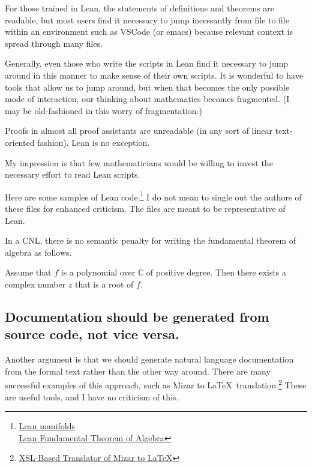 \documentclass[12pt]{amsart}
\renewcommand{\~}{\ }
\renewcommand{\_}{\textunderscore}
\begin{document}
For those trained in Lean, the statements of definitions and theorems
are readable, but most users find it necessary to jump incessantly
from file to file within an environment such as VSCode (or emacs)
because relevant context is spread through many files.

Generally, even those who write the scripts in Lean find it necessary
to jump around in this manner to make sense of their own scripts.  It
is wonderful to have tools that allow us to jump around, but when that
becomes the only possible mode of interaction, our thinking about
mathematics becomes fragmented.  (I may be old-fashioned in this worry
of fragmentation.)

Proofs in almost all proof assistants are unreadable (in any sort of
linear text-oriented fashion).  Lean is no exception.

My impression is that few mathematicians would be willing to
invest the necessary effort to read Lean scripts.


Here are some samples of Lean code.\footnote{
\href{https://github.com/sgouezel/mathlib/blob/manifold4/src/geometry/manifolds/manifold.lean}{Lean manifolds}
  \\ \href{https://github.com/leanprover-community/mathlib/blob/master/src/analysis/complex/polynomial.lean}{Lean Fundamental Theorem of Algebra}
}
I do not mean to single out the authors of these files for
enhanced criticism.  The files are meant to be representative
of Lean.

% 

In a CNL, there is no semantic penalty for writing the fundamental
theorem of algebra as follows.

Assume that $f$ is a polynomial over ${\mathbb C}$ of positive degree.
Then there exists a complex number $z$ that is a root of $f$.


\subsection{Documentation should be generated from source code, not vice versa.}

Another argument is that we should generate natural language
documentation from the formal text rather than the other way around.
There are many successful examples of this approach, such as Mizar to
\LaTeX\ translation.\footnote{\href{https://link.springer.com/chapter/10.1007/978-3-319-96812-4_1}{XSL-Based
    Translator of Mizar to LaTeX}} These are useful tools, and I have
no criticism of this.
\end{document}
